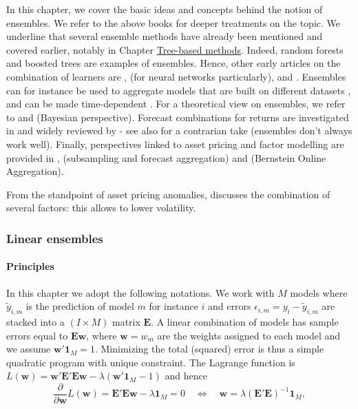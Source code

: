 In this chapter, we cover the basic ideas and concepts behind the notion of ensembles. We refer to the above books for deeper treatments on the topic. We underline that several ensemble methods have already been mentioned and covered earlier, notably in Chapter \href{/chap-07-trees}{Tree-based methods}. Indeed, random forests and boosted trees are examples of ensembles. Hence, other early articles on the combination of learners are \cite{schapire1990strength}, \cite{jacobs1991adaptive} (for neural networks particularly), and \cite{freund1997decision}. Ensembles can for instance be used to aggregate models that are built on different datasets \citep{pesaran2011forecast}, and can be made time-dependent \citep{sun2020time}. For a theoretical view on ensembles, we refer to \cite{peng2022improvability} and \cite{razin2020drowning} (Bayesian perspective). Forecast combinations for returns are investigated in \cite{cheng2022stock} and widely reviewed by \cite{wang2022forecast} - see also \cite{scholz2022forecast} for a contrarian take (ensembles don't always work well). Finally, perspectives linked to asset pricing and factor modelling are provided in \cite{gospodinov2020generalized}, \cite{de2020subsampled} (subsampling and forecast aggregation) and \cite{remlinger2023expert} (Bernstein Online Aggregation).

From the standpoint of asset pricing anomalies, \cite{reschenhofer2024combining} discusses the combination of several factors: this allows to lower volatility.

\subsubsection{Linear ensembles}

\paragraph{Principles}

In this chapter we adopt the following notations. We work with $M$ models where $\tilde{y}_{i,m}$ is the prediction of model $m$ for instance $i$ and errors $\epsilon_{i,m}=y_i -\tilde{y}_{i,m}$ are stacked into a $(I\times M)$ matrix $\textbf{E}$. A linear combination of models has sample errors equal to $\textbf{Ew}$, where $\textbf{w}=w_m$ are the weights assigned to each model and we assume $\textbf{w}'\textbf{1}_M=1$. Minimizing the total (squared) error is thus a simple quadratic program with unique constraint. The Lagrange function is $L(\textbf{w})=\textbf{w}'\textbf{E}'\textbf{E}\textbf{w} -\lambda (\textbf{w}'\textbf{1}_M -1)$ and hence
\begin{equation}
\frac{\partial}{\partial \textbf{w}}L(\textbf{w})=\textbf{E}'\textbf{E}\textbf{w}-\lambda \textbf{1}_M=0 \quad \Leftrightarrow \quad \textbf{w}=\lambda(\textbf{E}'\textbf{E})^{-1}\textbf{1}_M,
\end{equation}

